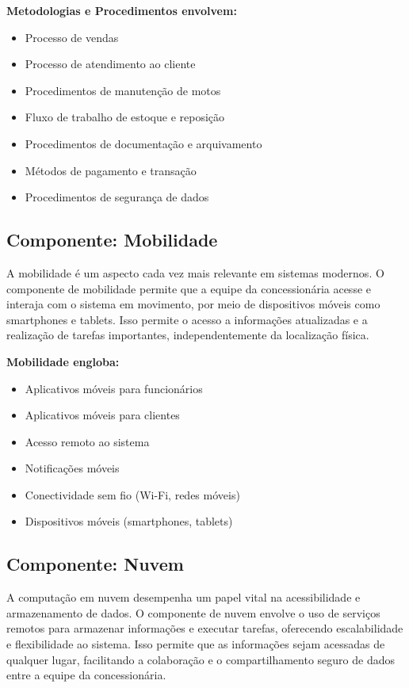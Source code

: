 	\textbf{Metodologias e Procedimentos envolvem:}
	
	\begin{itemize}
		\item Processo de vendas
		\item Processo de atendimento ao cliente
		\item Procedimentos de manutenção de motos
		\item Fluxo de trabalho de estoque e reposição
		\item Procedimentos de documentação e arquivamento
		\item Métodos de pagamento e transação
		\item Procedimentos de segurança de dados
	\end{itemize}


     \subsection{Componente: Mobilidade}
     A mobilidade é um aspecto cada vez mais relevante em sistemas modernos. O componente de mobilidade permite que a equipe da concessionária acesse e interaja com o sistema em movimento, por meio de dispositivos móveis como smartphones e tablets. Isso permite o acesso a informações atualizadas e a realização de tarefas importantes, independentemente da localização física.
     
	\textbf{Mobilidade engloba:}
	\begin{itemize}
		\item Aplicativos móveis para funcionários
		\item Aplicativos móveis para clientes
		\item Acesso remoto ao sistema
		\item Notificações móveis
		\item Conectividade sem fio (Wi-Fi, redes móveis)
		\item Dispositivos móveis (smartphones, tablets)
	\end{itemize}


     \subsection{Componente: Nuvem}
     A computação em nuvem desempenha um papel vital na acessibilidade e armazenamento de dados. O componente de nuvem envolve o uso de serviços remotos para armazenar informações e executar tarefas, oferecendo escalabilidade e flexibilidade ao sistema. Isso permite que as informações sejam acessadas de qualquer lugar, facilitando a colaboração e o compartilhamento seguro de dados entre a equipe da concessionária.
     
